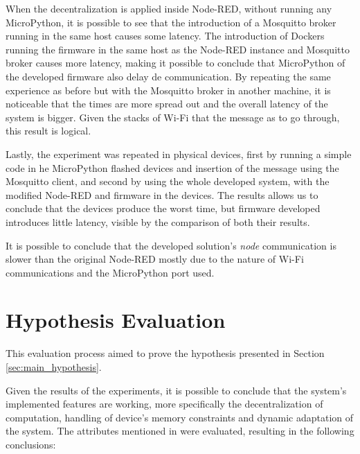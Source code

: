 When the decentralization is applied inside Node-RED, without running any MicroPython, it is possible to see that the introduction of a Mosquitto broker running in the same host causes some latency. The introduction of Dockers running the firmware in the same host as the Node-RED instance and Mosquitto broker causes more latency, making it possible to conclude that MicroPython of the developed firmware also delay de communication. By repeating the same experience as before but with the Mosquitto broker in another machine, it is noticeable that the times are more spread out and the overall latency of the system is bigger. Given the stacks of Wi-Fi that the message as to go through, this result is logical.

Lastly, the experiment was repeated in physical devices, first by running a simple code in he MicroPython flashed devices and insertion of the message using the Mosquitto client, and second by using the whole developed system, with the modified Node-RED and firmware in the devices. The results allows us to conclude that the devices produce the worst time, but firmware developed introduces little latency, visible by the comparison of both their results.

It is possible to conclude that the developed solution's \textit{node} communication is slower than the original Node-RED mostly due to the nature of Wi-Fi communications and the MicroPython port used.

\section{Hypothesis Evaluation}\label{sec:evaluation_hypothesis}

This evaluation process aimed to prove the hypothesis presented in Section \ref{sec:main_hypothesis}.

Given the results of the experiments, it is possible to conclude that the system's implemented features are working, more specifically the decentralization of computation, handling of device's memory constraints and dynamic adaptation of the system. The attributes mentioned in  were evaluated, resulting in the following conclusions:

